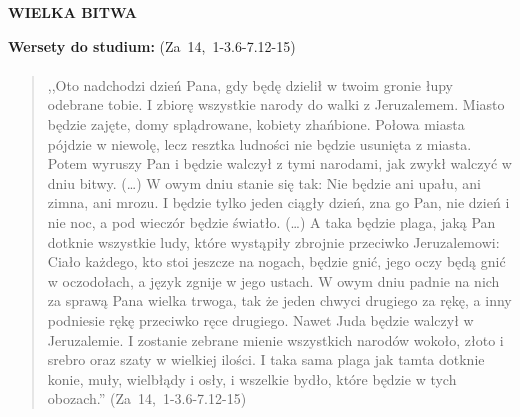 \documentclass[10pt,a4paper,oneside]{article}
\begin{document}
\centerline{\textbf{\MakeUppercase{Wielka bitwa}}}
\begin{center}
\textbf{Wersety do studium:} 
\mbox{(Za 14, 1-3.6-7.12-15)}
\end{center}
\paragraph{}
\begin{quote}
,,Oto nadchodzi dzień Pana, gdy będę dzielił w twoim gronie łupy odebrane tobie. I zbiorę wszystkie narody do walki z Jeruzalemem. Miasto będzie zajęte, domy splądrowane, kobiety zhańbione. Połowa miasta pójdzie w niewolę, lecz resztka ludności nie będzie usunięta z miasta. Potem wyruszy Pan i będzie walczył z tymi narodami, jak zwykł walczyć w dniu bitwy. (\ldots) W owym dniu stanie się tak: Nie będzie ani upału, ani zimna, ani mrozu. I będzie tylko jeden ciągły dzień, zna go Pan, nie dzień i nie noc, a pod wieczór będzie światło. (\ldots) A taka będzie plaga, jaką Pan dotknie wszystkie ludy, które wystąpiły zbrojnie przeciwko Jeruzalemowi: Ciało każdego, kto stoi jeszcze na nogach, będzie gnić, jego oczy będą gnić w oczodołach, a język zgnije w jego ustach. W owym dniu padnie na nich za sprawą Pana wielka trwoga, tak że jeden chwyci drugiego za rękę, a inny podniesie rękę przeciwko ręce drugiego. Nawet Juda będzie walczył w Jeruzalemie. I zostanie zebrane mienie wszystkich narodów wokoło, złoto i srebro oraz szaty w wielkiej ilości. I taka sama plaga jak tamta dotknie konie, muły, wielbłądy i osły, i wszelkie bydło, które będzie w tych obozach.'' \mbox{(Za 14, 1-3.6-7.12-15)}
\end{quote}
\end{document}
